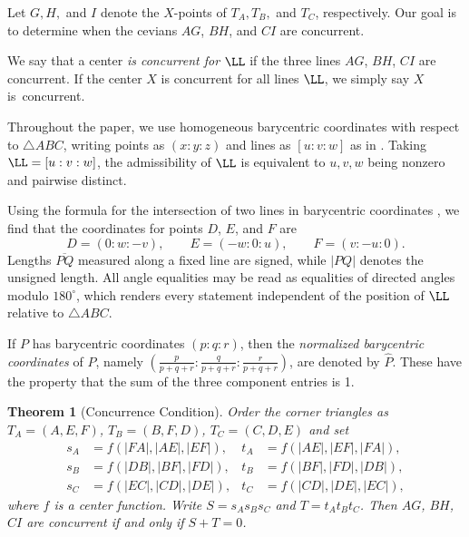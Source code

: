 \documentclass[12pt,a4paper]{amsart}
\newtheorem{theorem}{Theorem} [section]
\theoremstyle{remark}
\newcommand{\seg}[1]{\overline{#1}}
\begin{document}
Let $G,H,$ and $I$ denote the $X$-points of
$T_A,T_B,$ and $T_C$, respectively.
Our goal is to determine when the cevians
$AG$, $BH$, and $CI$ are concurrent.

We say that a center \emph{is concurrent
for $\LL$} if the three lines $AG$, $BH$, $CI$ are concurrent.
If the center $X$ is concurrent for all lines $\LL$, we simply say $X$ is~concurrent.


Throughout the paper, we use homogeneous barycentric coordinates with respect to $\triangle ABC$, writing points
as $(x:y:z)$ and lines as $[u:v:w]$ as in \cite{Yiu}.
Taking $\LL=[u:v:w]$, the admissibility of $\LL$ is equivalent to
$u,v,w$ being nonzero and pairwise distinct.

Using the formula for the intersection of two lines in barycentric coordinates \cite[eq.~(5)]{Grozdev},
we find that the coordinates for points $D$, $E$, and $F$ are
\begin{equation}
\label{eq:DEF}
   D=(0:w:-v),\qquad E=(-w:0:u),\qquad F=(v:-u:0).
\end{equation}
Lengths $\seg{PQ}$ measured along a fixed line are signed, while
$|PQ|$ denotes the unsigned length.
All angle equalities may be read as
equalities of directed angles modulo $180^\circ$, which renders every statement
independent of the position of $\LL$ relative to $\triangle ABC$.

If $P$ has barycentric coordinates $(p:q:r)$, then the \emph{normalized barycentric coordinates} of $P$,
namely $(\frac{p}{p+q+r}:\frac{q}{p+q+r}:\frac{r}{p+q+r})$, are denoted by $\widehat P$.
These have the property that the sum of the three component entries is 1.

\begin{theorem}[Concurrence Condition]
\label{thm:crit}
Order the corner triangles as $T_A=(A,E,F)$, $T_B=(B,F,D)$,
$T_C=(C,D,E)$ and set
\begin{equation}
\label{eq:s}
\begin{aligned}
  s_A&=f(|FA|,|AE|,|EF|), & t_A&=f(|AE|,|EF|,|FA|),\\
  s_B&=f(|DB|,|BF|,|FD|), & t_B&=f(|BF|,|FD|,|DB|),\\
  s_C&=f(|EC|,|CD|,|DE|), & t_C&=f(|CD|,|DE|,|EC|),
\end{aligned}
\end{equation}
where $f$ is a center function.
Write $S=s_As_Bs_C$ and $T=t_At_Bt_C$. Then $AG$, $BH$, $CI$ are concurrent if
and only if $S+T=0$.
\end{theorem}
\end{document}
